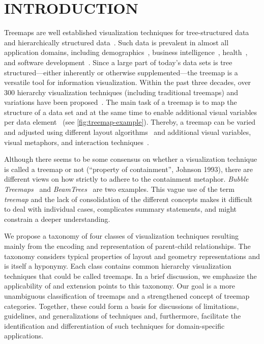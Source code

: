 \documentclass[a4paper,twoside]{article}
\begin{document}
\section{\uppercase{Introduction}}%
\label{sec:introduction}%
\noindent
Treemaps are well established visualization techniques for tree-structured data and hierarchically structured data~\cite{mcnabb2017-surveyofsurveys}.
Such data is prevalent in almost all application domains, including demographics~\cite{jern2009-choropleth}, business intelligence~\cite{roberts2018-business}, health~\cite{chazard2006-treemaps}, and software development~\cite{merino2018-softvis}.
Since a large part of today's data sets is tree structured---either inherently or otherwise supplemented---the treemap is a versatile tool for information visualization.
Within the past three decades, over 300 hierarchy visualization techniques (including traditional treemaps) and variations have been proposed~\cite{schulz2011-treevis}.
The main task of a treemap is to map the structure of a data set and at the same time to enable additional visual variables per data element~\cite{carpendale2003-visualvariables} (see \autoref{fig:treemap-example}).
Thereby, a treemap can be varied and adjusted using different layout algorithms~\cite{vernier2018-comparison} and additional visual variables, visual metaphors, and interaction techniques~\cite{limberger2019-softwaremap}.
\par
Although there seems to be some consensus on whether a visualization technique is called a treemap or not (\enquote{property of containment}, Johnson 1993), there are different views on how strictly to adhere to the containment metaphor.
\emph{Bubble Treemaps}~\cite{gortler2017-bubbletreemaps} and \emph{BeamTrees}~\cite{vanHam2003-beamtrees} are two examples.
This vague use of the term \emph{treemap} and the lack of consolidation of the different concepts makes it difficult to deal with individual cases, complicates summary statements, and might constrain a deeper understanding.
\par
We propose a taxonomy of four classes of visualization techniques resulting mainly from the encoding and representation of parent-child relationships.
The taxonomy considers typical properties of layout and geometry representations and is itself a hyponymy.
Each class contains common hierarchy visualization techniques that could be called treemaps.
In a brief discussion, we emphasize the applicability of and extension points to this taxonomy.
Our goal is a more unambiguous classification of treemaps and a strengthened concept of treemap categories.
Together, these could form a basis for discussions of limitations, guidelines, and generalizations of techniques and, furthermore, facilitate the identification and differentiation of such techniques for domain-specific applications.
\end{document}
